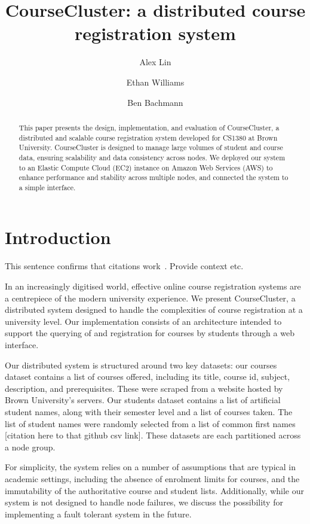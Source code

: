\documentclass[sigplan, screen, 10pt]{acmart}
\title{CourseCluster: a distributed course registration system}
\author{Alex Lin}
\affiliation{Brown University}
\author{Ethan Williams}
\affiliation{Brown University}
\author{Ben Bachmann}
\affiliation{Brown University}
\begin{document}
\begin{abstract}
  This paper presents the design, implementation, and evaluation of CourseCluster, a distributed and scalable course registration system developed for CS1380 at Brown University. CourseCluster is designed to manage large volumes of student and course data, ensuring scalability and data consistency across nodes. We deployed our system to an Elastic Compute Cloud (EC2) instance on Amazon Web Services (AWS) to enhance performance and stability across multiple nodes, and connected the system to a simple interface.
\end{abstract}

\maketitle


\section{Introduction}
\label{intro}

This sentence confirms that citations work~\cite{kpn74, dryad07}. Provide
context etc.

In an increasingly digitised world, effective online course registration systems are a centrepiece of the modern university experience. We present CourseCluster, a distributed system designed to handle the complexities of course registration at a university level. Our implementation consists of an architecture intended to support the querying of and registration for courses by students through a web interface.

Our distributed system is structured around two key datasets: our courses dataset contains a list of courses offered, including its title, course id, subject, description, and prerequisites. These were scraped from a website hosted by Brown University’s servers. Our students dataset contains a list of artificial student names, along with their semester level and a list of courses taken. The list of student names were randomly selected from a list of common first names [citation here to that github csv link]. These datasets are each partitioned across a node group.

For simplicity, the system relies on a number of assumptions that are typical in academic settings, including the absence of enrolment limits for courses, and the immutability of the authoritative course and student lists. Additionally, while our system is not designed to handle node failures, we discuss the possibility for implementing a fault tolerant system in the future.
\end{document}
